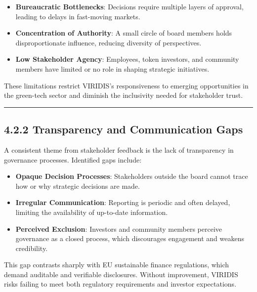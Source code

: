 \documentclass[
  english,
  12pt,
  oneside,
  open=any]{scrbook}
\providecommand{\tightlist}{%
  \setlength{\itemsep}{0pt}\setlength{\parskip}{0pt}}\usepackage{longtable,booktabs,array}
\begin{document}
\begin{itemize}
\tightlist
\item
  \textbf{Bureaucratic Bottlenecks}: Decisions require multiple layers
  of approval, leading to delays in fast-moving markets.\\
\item
  \textbf{Concentration of Authority}: A small circle of board members
  holds disproportionate influence, reducing diversity of
  perspectives.\\
\item
  \textbf{Low Stakeholder Agency}: Employees, token investors, and
  community members have limited or no role in shaping strategic
  initiatives.
\end{itemize}

These limitations restrict VIRIDIS's responsiveness to emerging
opportunities in the green-tech sector and diminish the inclusivity
needed for stakeholder trust.

\begin{center}\rule{0.5\linewidth}{0.5pt}\end{center}

\subsection{4.2.2 Transparency and Communication Gaps}\label{sec-comm}

A consistent theme from stakeholder feedback is the lack of transparency
in governance processes. Identified gaps include:

\begin{itemize}
\tightlist
\item
  \textbf{Opaque Decision Processes}: Stakeholders outside the board
  cannot trace how or why strategic decisions are made.\\
\item
  \textbf{Irregular Communication}: Reporting is periodic and often
  delayed, limiting the availability of up-to-date information.\\
\item
  \textbf{Perceived Exclusion}: Investors and community members perceive
  governance as a closed process, which discourages engagement and
  weakens credibility.
\end{itemize}

This gap contrasts sharply with EU sustainable finance regulations,
which demand auditable and verifiable disclosures. Without improvement,
VIRIDIS risks failing to meet both regulatory requirements and investor
expectations.
\end{document}
